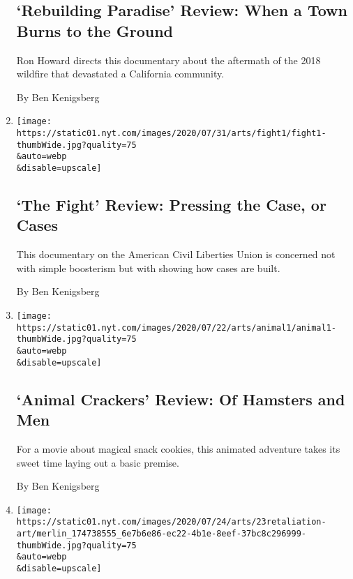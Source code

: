 \begin{enumerate}
  \hypertarget{rebuilding-paradise-review-when-a-town-burns-to-the-ground}{%
  \subsection{`Rebuilding Paradise' Review: When a Town Burns to the
  Ground}\label{rebuilding-paradise-review-when-a-town-burns-to-the-ground}}

  Ron Howard directs this documentary about the aftermath of the 2018
  wildfire that devastated a California community.

  By Ben Kenigsberg
\item
  \href{/2020/07/30/movies/the-fight-review.html}{}

  \texttt{[image: https://static01.nyt.com/images/2020/07/31/arts/fight1/fight1-thumbWide.jpg?quality=75\\\&auto=webp\\\&disable=upscale]}

  \hypertarget{the-fight-review-pressing-the-case-or-cases}{%
  \subsection{`The Fight' Review: Pressing the Case, or
  Cases}\label{the-fight-review-pressing-the-case-or-cases}}

  This documentary on the American Civil Liberties Union is concerned
  not with simple boosterism but with showing how cases are built.

  By Ben Kenigsberg
\item
  \href{/2020/07/24/movies/animal-crackers-review.html}{}

  \texttt{[image: https://static01.nyt.com/images/2020/07/22/arts/animal1/animal1-thumbWide.jpg?quality=75\\\&auto=webp\\\&disable=upscale]}

  \hypertarget{animal-crackers-review-of-hamsters-and-men}{%
  \subsection{`Animal Crackers' Review: Of Hamsters and
  Men}\label{animal-crackers-review-of-hamsters-and-men}}

  For a movie about magical snack cookies, this animated adventure takes
  its sweet time laying out a basic premise.

  By Ben Kenigsberg
\item
  \href{/2020/07/23/movies/retaliation-review.html}{}

  \texttt{[image: https://static01.nyt.com/images/2020/07/24/arts/23retaliation-art/merlin\_174738555\_6e7b6e86-ec22-4b1e-8eef-37bc8c296999-thumbWide.jpg?quality=75\\\&auto=webp\\\&disable=upscale]}


\end{enumerate}
